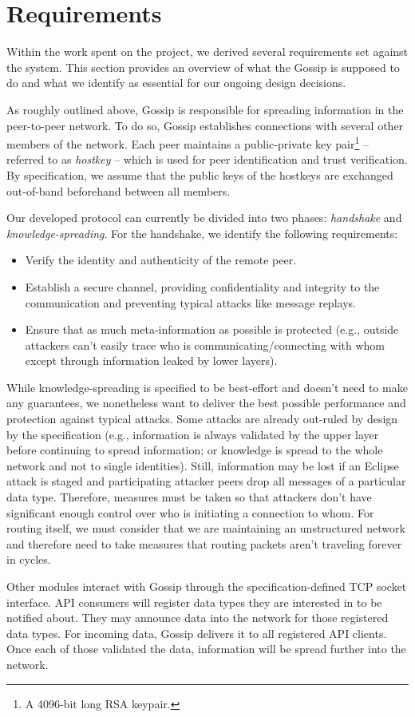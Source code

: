 \section{Requirements}\label{sec:requirements}

Within the work spent on the project, we derived several requirements set against the system.
This section provides an overview of what the Gossip is supposed to do and what we identify as essential
for our ongoing design decisions.

As roughly outlined above, Gossip is responsible for spreading information in the peer-to-peer network.
To do so, Gossip establishes connections with several other members of the network.
Each peer maintains a public-private key pair\footnote{A 4096-bit long RSA keypair.} -- referred to
as \textit{hostkey} -- which is used for peer identification and trust verification.
By specification, we assume that the public keys of the hostkeys are exchanged out-of-band
beforehand between all members.

Our developed protocol can currently be divided into two phases: \textit{handshake} and \textit{knowledge-spreading}.
For the handshake, we identify the following requirements:
\begin{itemize}
    \setlength\itemsep{0em}
    \item Verify the identity and authenticity of the remote peer.
    \item Establish a secure channel, providing confidentiality and integrity to the communication
    and preventing typical attacks like message replays.
    \item Ensure that as much meta-information as possible is protected (e.g., outside attackers can't easily
    trace who is communicating/connecting with whom except through information leaked by lower layers).
\end{itemize}

While knowledge-spreading is specified to be best-effort and doesn't need to make any guarantees,
we nonetheless want to deliver the best possible performance and protection against typical attacks.
Some attacks are already out-ruled by design by the specification (e.g., information is always validated
by the upper layer before continuing to spread information;
or knowledge is spread to the whole network and not to single identities).
Still, information may be lost if an Eclipse attack is staged and participating attacker peers drop all messages
of a particular data type.
Therefore, measures must be taken so that attackers don't have significant enough control over who is
initiating a connection to whom.
For routing itself, we must consider that we are maintaining an unstructured network and therefore need to
take measures that routing packets aren’t traveling forever in cycles.

Other modules interact with Gossip through the specification-defined TCP socket interface.
API consumers will register data types they are interested in to be notified about.
They may announce data into the network for those registered data types.
For incoming data, Gossip delivers it to all registered API clients.
Once each of those validated the data, information will be spread further into the network.
